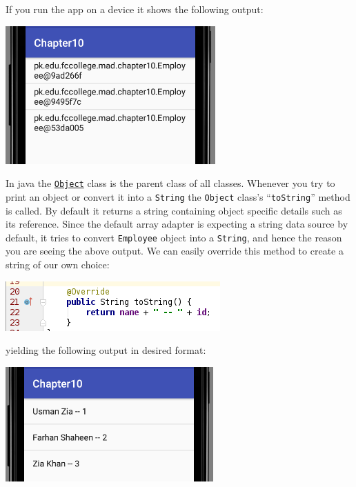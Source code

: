 If you run the app on a device it shows the following output:

\begin{center}
	\includegraphics[scale=0.4]{chapters/ch10/images/16}
\end{center}

In java the \href{https://developer.android.com/reference/java/lang/Object.html}{\texttt{Object}} class is the parent class of all classes. Whenever you try to print an object or convert it into a \texttt{String} the \texttt{Object} class's ``\texttt{toString}'' method is called. By default it returns a string containing object specific details such as its reference. Since the default array adapter is expecting a string data source by default, it tries to convert \texttt{Employee} object into a \texttt{String}, and hence the reason you are seeing the above output. We can easily override this method to create a string of our own choice:

\begin{center}
	\includegraphics[scale=0.4]{chapters/ch10/images/17}
\end{center}

yielding the following output in desired format:

\begin{center}
	\includegraphics[scale=0.4]{chapters/ch10/images/18}
\end{center}

